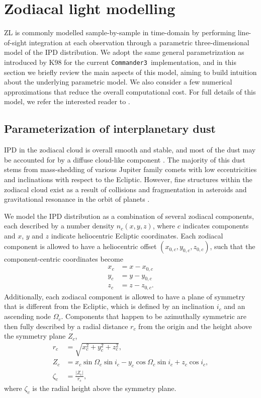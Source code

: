\documentclass[twocolumn]{aa}
\def\commanderthree{\texttt{Commander3}}
\begin{document}
\section{Zodiacal light modelling}\label{sect:zodi-model}
ZL is commonly modelled sample-by-sample in time-domain by performing
line-of-sight integration at each observation through a parametric
three-dimensional model of the IPD distribution. We adopt the same
general parametrization as introduced by K98 for the current
\commanderthree\ implementation, and in this section we briefly review
the main aspects of this model, aiming to build intuition about the
underlying parametric model. We also consider a few numerical
approximations that reduce the overall computational cost. For full
details of this model, we refer the interested reader to
\citet{Kelsall1998}.

\subsection{Parameterization of interplanetary dust}
IPD in the zodiacal cloud is overall smooth and stable, and most of
the dust may be accounted for by a diffuse cloud-like component
\citep{Leinert1998}.  The majority of this dust stems from
mass-shedding of various Jupiter family comets with low eccentricities
and inclinations with respect to the Ecliptic. However, fine
structures within the zodiacal cloud exist as a result of collisions
and fragmentation in asteroids and gravitational resonance in the
orbit of planets \citep{Low1984, Dermott1984, Dermott1994, Reach1997}.

We model the IPD distribution as a combination of several zodiacal
components, each described by a number density $n_c(x,y,z)$, where $c$
indicates components and $x$, $y$ and $z$ indicate heliocentric
Ecliptic coordinates. Each zodiacal component is allowed to have a
heliocentric offset $(x_{0,c}, y_{0,c}, z_{0,c})$, such that the
component-centric coordinates become
\begin{equation}    
    \begin{aligned}
        x_c&= x - x_{0,c}\\
        y_c&= y - y_{0,c}\\
        z_c&= z - z_{0,c}.
    \end{aligned}
\end{equation}
Additionally, each zodiacal component is allowed to have a plane of
symmetry that is different from the Ecliptic, which is defined by an
inclination $i_c$ and an ascending node $\Omega_c$. Components that
happen to be azimuthally symmetric are then fully described by a
radial distance $r_c$ from the origin and the height above the
symmetry plane $Z_c$,
\begin{align}
    r_c &= \sqrt{x_c^2 + y_c^2 + z_c^2},\\
    Z_c &= x_c\sin{\Omega_c}\sin{i_c} - y_c \cos{\Omega_c}\sin{i_c} + z_c \cos{i_c},\\
    \zeta_c &= \frac{|Z_\mathrm{c}|}{r_\mathrm{c}},
\end{align}
where $\zeta_c$ is the radial height above the symmetry plane.
\end{document}

